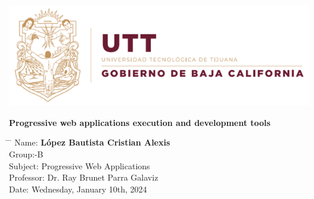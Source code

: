 \documentclass[12pt,a4paper]{article}
\title{}
\author{}
\date{}
\begin{document}
	
	\newcommand{\subf}[2]{%
		{\small\begin{tabular}[t]{@{}c@{}}
				#1\\#2
		\end{tabular}}%
	}
	
	\begin{titlepage}
		\begin{center}
			
			\textbf{}
            \includegraphics[width=1\textwidth]{utt.png}

            \vspace*{3cm}

			\vspace{1.5cm}
			
			\Huge
			\textbf{Progressive web applications execution and development tools}
			
			\vspace{0.8cm}
			\large
			
			\vspace{0.5cm}
			\LARGE
			
			
			\vfill
			
			
			
			\vspace{0.8cm}
			
			
			
			\Large
			
			
			
			
		\end{center}
		\Large
		\begin{tabbing}
			\hspace*{1em}\= \hspace*{8em} \= \kill %
			\> Name:\>  \textbf{López Bautista Cristian Alexis} \\
			\> Group:\>  10-B \\
			\> Subject:\>  Progressive Web Applications  \\
			\> Professor:  \> Dr. Ray Brunet Parra Galaviz \\
			\> Date: \>  Wednesday, January 10th, 2024
		\end{tabbing}
		
	\end{titlepage}
	
\end{document}
